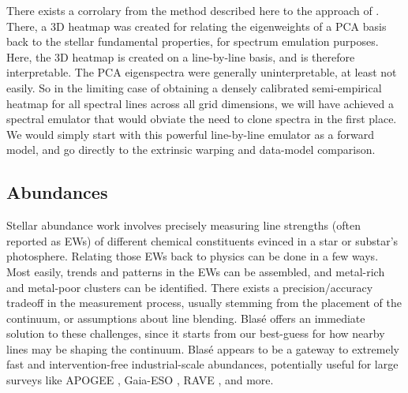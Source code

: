 \documentclass[twocolumn]{aastex631}
\begin{document}
There exists a corrolary from the method described here to the approach of \citet{czekala15}.  There, a 3D heatmap was created for relating the eigenweights of a PCA basis back to the stellar fundamental properties, for spectrum emulation purposes.  Here, the 3D heatmap is created on a line-by-line basis, and is therefore interpretable.  The PCA eigenspectra were generally uninterpretable, at least not easily.  So in the limiting case of obtaining a densely calibrated semi-empirical heatmap for all spectral lines across all grid dimensions, we will have achieved a spectral emulator that would obviate the need to clone spectra in the first place.  We would simply start with this powerful line-by-line emulator as a forward model, and go directly to the extrinsic warping and data-model comparison.



\subsection{Abundances}\label{secAbundance}

Stellar abundance work involves precisely measuring line strengths (often reported as EWs) of different chemical constituents evinced in a star or substar's photosphere.  Relating those EWs back to physics can be done in a few ways.  Most easily, trends and patterns in the EWs can be assembled, and metal-rich and metal-poor clusters can be identified.  There exists a precision/accuracy tradeoff in the measurement process, usually stemming from the placement of the continuum, or assumptions about line blending.  Blas\'e offers an immediate solution to these challenges, since it starts from our best-guess for how nearby lines may be shaping the continuum.  Blas\'e appears to be a gateway to extremely fast and intervention-free industrial-scale abundances, potentially useful for large surveys like APOGEE \citep{2017AJ....154...94M}, Gaia-ESO \citep{2012Msngr.147...25G}, RAVE \citep{2006AJ....132.1645S}, and more.
\end{document}
